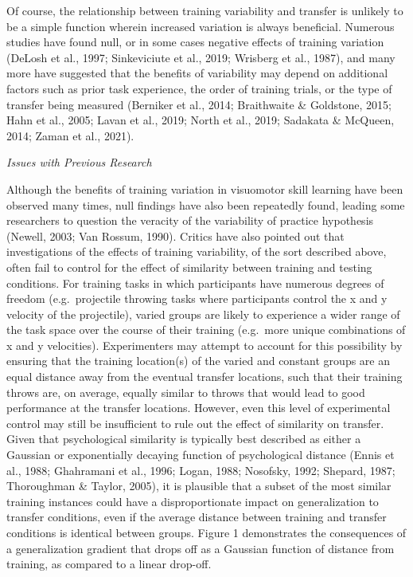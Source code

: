 \documentclass[
  jou, donotrepeattitle,floatsintext]{apa7}
\begin{document}
Of course, the relationship between training variability and transfer is unlikely to be a simple function wherein increased variation is always beneficial. Numerous studies have found null, or in some cases negative effects of training variation (DeLosh et al., 1997; Sinkeviciute et al., 2019; Wrisberg et al., 1987), and many more have suggested that the benefits of variability may depend on additional factors such as prior task experience, the order of training trials, or the type of transfer being measured (Berniker et al., 2014; Braithwaite \& Goldstone, 2015; Hahn et al., 2005; Lavan et al., 2019; North et al., 2019; Sadakata \& McQueen, 2014; Zaman et al., 2021).

\emph{Issues with Previous Research}

Although the benefits of training variation in visuomotor skill learning have been observed many times, null findings have also been repeatedly found, leading some researchers to question the veracity of the variability of practice hypothesis (Newell, 2003; Van Rossum, 1990). Critics have also pointed out that investigations of the effects of training variability, of the sort described above, often fail to control for the effect of similarity between training and testing conditions. For training tasks in which participants have numerous degrees of freedom (e.g.~projectile throwing tasks where participants control the x and y velocity of the projectile), varied groups are likely to experience a wider range of the task space over the course of their training (e.g.~more unique combinations of x and y velocities). Experimenters may attempt to account for this possibility by ensuring that the training location(s) of the varied and constant groups are an equal distance away from the eventual transfer locations, such that their training throws are, on average, equally similar to throws that would lead to good performance at the transfer locations. However, even this level of experimental control may still be insufficient to rule out the effect of similarity on transfer. Given that psychological similarity is typically best described as either a Gaussian or exponentially decaying function of psychological distance (Ennis et al., 1988; Ghahramani et al., 1996; Logan, 1988; Nosofsky, 1992; Shepard, 1987; Thoroughman \& Taylor, 2005), it is plausible that a subset of the most similar training instances could have a disproportionate impact on generalization to transfer conditions, even if the average distance between training and transfer conditions is identical between groups. Figure 1 demonstrates the consequences of a generalization gradient that drops off as a Gaussian function of distance from training, as compared to a linear drop-off.
\end{document}
